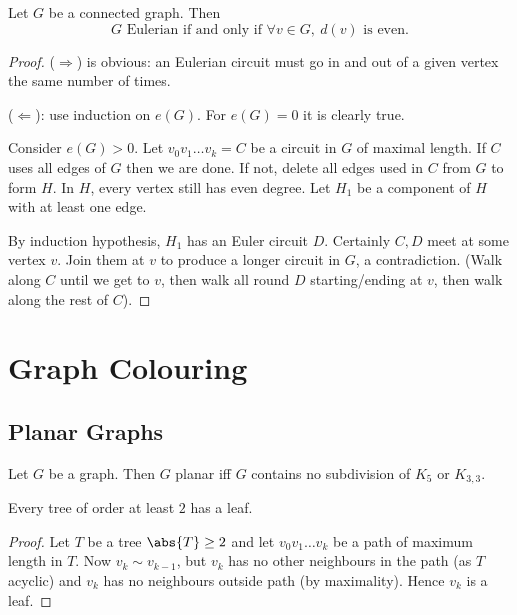 \documentclass{article}
\begin{document}
\begin{nprop}\label{thm:18}
    Let $G$ be a connected graph. Then
    \begin{equation*}
        G\text{ Eulerian if and only if } \forall v \in G,\ d(v)\text{ is even.}
    \end{equation*}
\end{nprop}
\begin{proof}
    ($\Rightarrow$) is obvious: an Eulerian circuit must go in and out of a given vertex the same number of times.

    ($\Leftarrow$): use induction on $e(G)$. For $e(G) = 0$ it is clearly true.

    Consider $e(G) > 0$. Let $v_0 v_1 \dotsc v_k = C$ be a circuit in $G$ of maximal length.
    If $C$ uses all edges of $G$ then we are done.
    If not, delete all edges used in $C$ from $G$ to form $H$.
    In $H$, every vertex still has even degree. Let $H_1$ be a component of $H$ with at least one edge.

    By induction hypothesis, $H_1$ has an Euler circuit $D$.
    Certainly $C, D$ meet at some vertex $v$.
    Join them at $v$ to produce a longer circuit in $G$, a contradiction.
    (Walk along $C$ until we get to $v$, then walk all round $D$ starting/ending at $v$, then walk along the rest of $C$).
\end{proof}
\clearpage
\section{Graph Colouring}







\subsection{Planar Graphs}










\begin{nthm}\label{thm:19}
    Let $G$ be a graph. Then $G$ planar iff $G$ contains no subdivision of $K_5$ or $K_{3,3}$.
\end{nthm}





\begin{nprop}\label{prop:20}
    Every tree of order at least $2$ has a leaf.
\end{nprop}
\begin{proof}
    Let $T$ be a tree $\abs{T} \geq 2$ and let $v_0 v_1 \dotsc v_k$ be a path of maximum length in $T$.
    Now $v_k \sim v_{k-1}$, but $v_k$ has no other neighbours in the path (as $T$ acyclic) and $v_k$ has no neighbours outside path (by maximality).
    Hence $v_k$ is a leaf.
\end{proof}
\end{document}
